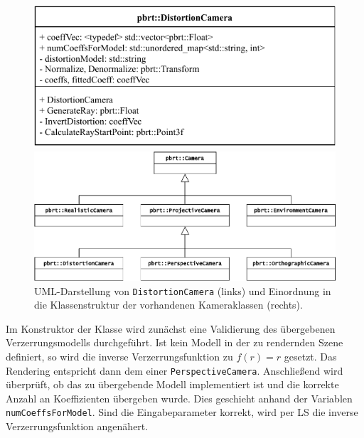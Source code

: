 \begin{figure}[h]
	\begin{minipage}{.5\textwidth}
		\centering
		\includegraphics[height=.4\columnwidth]{uml_distortioncam}
	\end{minipage}
	\begin{minipage}{.5\textwidth}
		\centering
		\includegraphics[height=.4\columnwidth]{uml_classes}
	\end{minipage}
	\caption{UML-Darstellung von \texttt{DistortionCamera} (links) und Einordnung in die Klassenstruktur der vorhandenen Kameraklassen (rechts).}
	\label{fig:uml}
\end{figure}

Im Konstruktor der Klasse wird zunächst eine Validierung des übergebenen Verzerrungsmodells durchgeführt. Ist kein Modell in der zu rendernden Szene definiert, so wird die inverse Verzerrungsfunktion zu $f(r) = r$ gesetzt. Das Rendering entspricht dann dem einer \texttt{PerspectiveCamera}. Anschließend wird überprüft, ob das zu übergebende Modell implementiert ist und die korrekte Anzahl an Koeffizienten übergeben wurde. Dies geschieht anhand der Variablen \texttt{numCoeffsForModel}. Sind die Eingabeparameter korrekt, wird per LS die inverse Verzerrungsfunktion angenähert.


